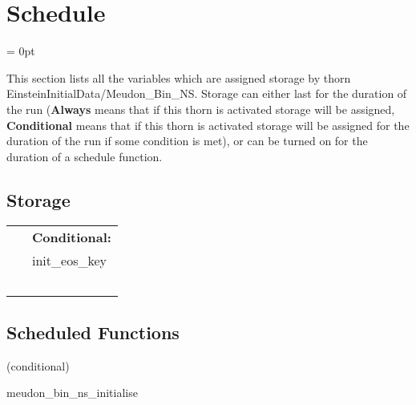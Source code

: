 
\section{Schedule} 


\parskip = 0pt


\noindent This section lists all the variables which are assigned storage by thorn EinsteinInitialData/Meudon\_Bin\_NS.  Storage can either last for the duration of the run ({\bf Always} means that if this thorn is activated storage will be assigned, {\bf Conditional} means that if this thorn is activated storage will be assigned for the duration of the run if some condition is met), or can be turned on for the duration of a schedule function.


\subsection*{Storage}

\hspace{5mm}

 \begin{tabular*}{160mm}{ll} 
~& {\bf Conditional:} \\ 
~ &  init\_eos\_key\\ 
~ & ~\\ 
\end{tabular*} 


\subsection*{Scheduled Functions}
\vspace{5mm}

   (conditional) 

\hspace{5mm} meudon\_bin\_ns\_initialise 

\hspace{5mm}{\it set up binary neutron star initial data } 


\hspace{5mm}

